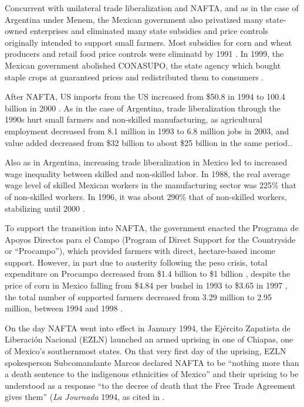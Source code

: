 \documentclass[12pt,a4paper]{article}\usepackage[]{graphicx}\usepackage[]{color}
\begin{document}
Concurrent with unilateral trade liberalization and NAFTA, and as in the case of Argentina under Menem, the Mexican government also privatized many state-owned enterprises and eliminated many state subsidies and price controls originally intended to support small farmers. Most subsidies for corn and wheat producers and retail food price controls were eliminatd by 1991 \parencite[295]{Hufbauer:2005vh}. In 1999, the Mexican government abolished CONASUPO, the state agency which bought staple crops at guaranteed prices and redistributed them to consumers \parencite[12]{Villareal:2010vk}.

After NAFTA, US imports from the US increased from \$50.8 in 1994 to 100.4 billion in 2000 \parencite[10]{Villareal:2010vk}. As in the case of Argentina, trade liberalization through the 1990s hurt small farmers and non-skilled manufacturing, as agricultural employment decreased from 8.1 million in 1993 to 6.8 million jobs in 2003, and value added decreased from \$32 billion to about \$25 billion in the same period.\parencites[289]{Hufbauer:2005vh}[14]{Villareal:2010vk}.

Also as in Argentina, increasing trade liberalization in Mexico led to increased wage inequality between skilled and non-skilled labor. In 1988, the real average wage level of skilled Mexican workers in the manufacturing sector was 225\% that of non-skilled workers. In 1996, it was about 290\% that of non-skilled workers, stabilizing until 2000 \parencite[9]{Villareal:2010vk}.

To support the transition into NAFTA, the government enacted the Programa de Apoyos Directos para el Campo (Program of Direct Support for the Countryside or “Procampo”), which provided farmers with direct, hectare-based income support. However, in part due to austerity following the peso crisis, total expenditure on Procampo decreased from \$1.4 billion to \$1 billion \parencite[295]{Hufbauer:2005vh}, despite the price of corn in Mexico falling from \$4.84 per bushel in 1993 to \$3.65 in 1997 \parencite[12]{Villareal:2010vk}, the total number of supported farmers decreased from 3.29 million to 2.95 million, between 1994 and 1998 \parencite[295]{Hufbauer:2005vh}.

On the day NAFTA went into effect in January 1994, the Ejército Zapatista de Liberación Nacional (EZLN) launched an armed uprising in one of Chiapas, one of Mexico's southernmost states. On that very first day of the uprising, EZLN spokesperson Subcomandante Marcos declared NAFTA to be “nothing more than a death sentence to the indigenous ethnicities of Mexico” and their uprising to be understood as a response “to the decree of death that the Free Trade Agreement gives them” (\emph{La Journada} 1994, as cited in \cite[216]{Hayden:2009uy}.
\end{document}
